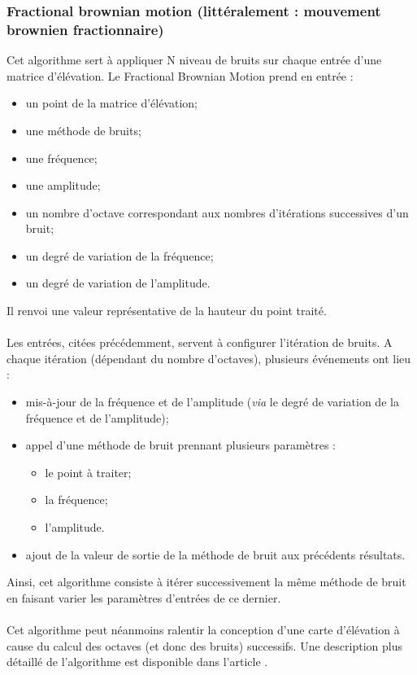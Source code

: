 \subsubsection{Fractional brownian motion (littéralement : mouvement brownien fractionnaire)}
Cet algorithme sert à appliquer N niveau de bruits sur chaque entrée d'une matrice d'élévation.
Le Fractional Brownian Motion prend en entrée :
\begin{itemize}
 \item un point de la matrice d'élévation;
 \item une méthode de bruits;
 \item une fréquence;
 \item une amplitude;
 \item un nombre d'octave correspondant aux nombres d'itérations successives d'un bruit;
 \item un degré de variation de la fréquence;
 \item un degré de variation de l'amplitude.
\end{itemize}
Il renvoi une valeur représentative de la hauteur du point traité.
\paragraph{}
Les entrées, citées précédemment, servent à configurer l'itération de bruits.
A chaque itération (dépendant du nombre d'octaves), plusieurs événements ont lieu :
\begin{itemize}
 \item mis-à-jour de la fréquence et de l'amplitude (\textit{via} le degré de variation de la fréquence et de l'amplitude);
 \item appel d'une méthode de bruit prennant plusieurs paramètres :
 \begin{itemize}
  \item le point à traiter;
  \item la fréquence;
  \item l'amplitude.
 \end{itemize}
 \item ajout de la valeur de sortie de la méthode de bruit aux précédents résultats.
\end{itemize}
Ainsi, cet algorithme consiste à itérer successivement la même méthode de bruit en faisant varier les paramètres d'entrées de ce dernier.
\paragraph{} 
Cet algorithme peut néanmoins ralentir la conception d'une carte d'élévation à cause du calcul des octaves (et donc des bruits) successifs.
Une description plus détaillé de l'algorithme est disponible dans l'article \cite{Mand68}.


